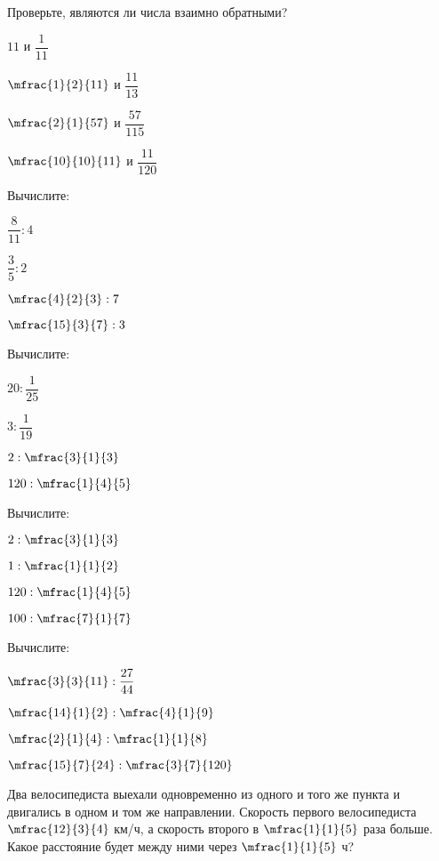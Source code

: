 %
%
\begin{homework}[number=1]
	\begin{listofex}
		\item Проверьте, являются ли числа взаимно обратными?
		\begin{enumcols}[itemcolumns=4]
			\item \( 11 \) и \( \dfrac{1}{11} \)
			\item \( \mfrac{1}{2}{11} \) и \( \dfrac{11}{13} \)
			\item \( \mfrac{2}{1}{57} \) и \( \dfrac{57}{115} \)
			\item \( \mfrac{10}{10}{11} \) и \( \dfrac{11}{120} \)
		\end{enumcols}
		\item Вычислите:
		\begin{enumcols}[itemcolumns=4]
			\item \( \dfrac{8}{11}:4 \)
			\item \( \dfrac{3}{5}:2 \)
			\item \( \mfrac{4}{2}{3}:7 \)
			\item \( \mfrac{15}{3}{7}:3 \)
		\end{enumcols}
		\item Вычислите:
	\begin{enumcols}[itemcolumns=4]
		\item \( 20:\dfrac{1}{25} \)
		\item \( 3:\dfrac{1}{19} \)
		\item \( 2:\mfrac{3}{1}{3} \)
		\item \( 120:\mfrac{1}{4}{5} \)
	\end{enumcols}
		\item Вычислите:
	\begin{enumcols}[itemcolumns=4]
		\item \( 2:\mfrac{3}{1}{3} \)
		\item \( 1:\mfrac{1}{1}{2} \)
		\item \( 120:\mfrac{1}{4}{5} \)
		\item \( 100:\mfrac{7}{1}{7} \)
	\end{enumcols}
		\item Вычислите:
		\begin{enumcols}[itemcolumns=4]
			\item \( \mfrac{3}{3}{11}:\dfrac{27}{44} \)
			\item \( \mfrac{14}{1}{2}:\mfrac{4}{1}{9} \)
			\item \( \mfrac{2}{1}{4}:\mfrac{1}{1}{8} \)
			\item \( \mfrac{15}{7}{24}:\mfrac{3}{7}{120} \)
		\end{enumcols}
		\item Два велосипедиста выехали одновременно из одного и того же пункта и двигались в одном и том же направлении. Скорость первого велосипедиста \( \mfrac{12}{3}{4} \) км/ч, а скорость второго в \( \mfrac{1}{1}{5} \) раза больше. Какое расстояние будет между ними через \( \mfrac{1}{1}{5} \) ч?
	\end{listofex}
\end{homework}
